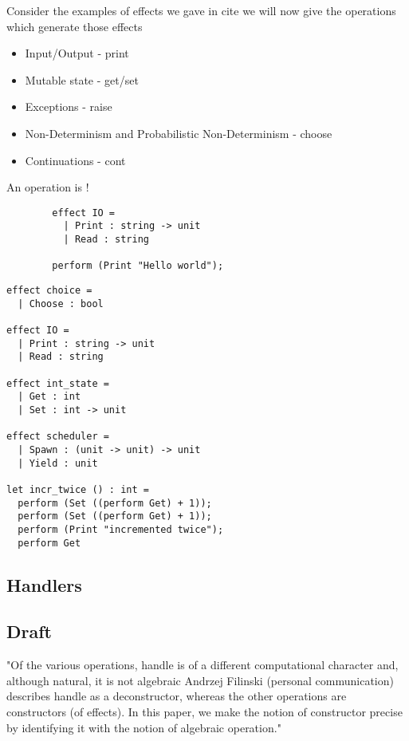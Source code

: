\begin{example}
    Consider the examples of effects we gave in cite
    we will now give the operations which generate those effects
    \begin{itemize}
        \item Input/Output - print
        \item Mutable state - get/set
        \item Exceptions - raise
        \item Non-Determinism and Probabilistic Non-Determinism - choose
        \item Continuations - cont
    \end{itemize}
\end{example}

\begin{definition}
    An operation is !

    \begin{verbatim}
        effect IO =
          | Print : string -> unit
          | Read : string

        perform (Print "Hello world");
    \end{verbatim}
\end{definition}

\begin{verbatim}
effect choice =
  | Choose : bool

effect IO =
  | Print : string -> unit
  | Read : string

effect int_state =
  | Get : int
  | Set : int -> unit

effect scheduler =
  | Spawn : (unit -> unit) -> unit
  | Yield : unit

let incr_twice () : int =
  perform (Set ((perform Get) + 1));
  perform (Set ((perform Get) + 1));
  perform (Print "incremented twice");
  perform Get
\end{verbatim}

\subsection{Handlers}
\cite{Plotkin:2002dw}

\subsection{Draft}

"Of the various operations, handle is of a different computational character and, although natural, it is not algebraic
Andrzej Filinski (personal communication) describes handle as a deconstructor, whereas the other operations are constructors (of effects). In this paper, we make the notion of constructor precise by identifying it with the notion of algebraic operation."

